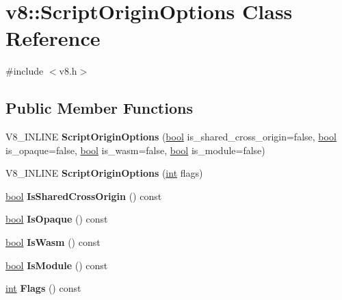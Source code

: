 \hypertarget{classv8_1_1ScriptOriginOptions}{}\section{v8\+:\+:Script\+Origin\+Options Class Reference}
\label{classv8_1_1ScriptOriginOptions}


{\ttfamily \#include $<$v8.\+h$>$}

\subsection*{Public Member Functions}
\begin{DoxyCompactItemize}
\item 
\mbox{\label{classv8_1_1ScriptOriginOptions_ae041fe05628cdd2d434c8780f45ac1e4}} 
V8\+\_\+\+I\+N\+L\+I\+NE {\bfseries Script\+Origin\+Options} (\mbox{\hyperlink{classbool}{bool}} is\+\_\+shared\+\_\+cross\+\_\+origin=false, \mbox{\hyperlink{classbool}{bool}} is\+\_\+opaque=false, \mbox{\hyperlink{classbool}{bool}} is\+\_\+wasm=false, \mbox{\hyperlink{classbool}{bool}} is\+\_\+module=false)
\item 
\mbox{\label{classv8_1_1ScriptOriginOptions_a5c814c5602db2c9ed5c6bc7f05b1d430}} 
V8\+\_\+\+I\+N\+L\+I\+NE {\bfseries Script\+Origin\+Options} (\mbox{\hyperlink{classint}{int}} flags)
\item 
\mbox{\label{classv8_1_1ScriptOriginOptions_af899dc2dfbcfdbe84eb57ca5f6e92c86}} 
\mbox{\hyperlink{classbool}{bool}} {\bfseries Is\+Shared\+Cross\+Origin} () const
\item 
\mbox{\label{classv8_1_1ScriptOriginOptions_ab6fb2e1fee9bf7cd5a4b141c3abc5df3}} 
\mbox{\hyperlink{classbool}{bool}} {\bfseries Is\+Opaque} () const
\item 
\mbox{\label{classv8_1_1ScriptOriginOptions_a31e78eb1c657b0cf029116b6147f03a5}} 
\mbox{\hyperlink{classbool}{bool}} {\bfseries Is\+Wasm} () const
\item 
\mbox{\label{classv8_1_1ScriptOriginOptions_a30b72cba616f576272a29b6e199c9c35}} 
\mbox{\hyperlink{classbool}{bool}} {\bfseries Is\+Module} () const
\item 
\mbox{\label{classv8_1_1ScriptOriginOptions_ad66acb13746ba12f6b5177c215e4d10d}} 
\mbox{\hyperlink{classint}{int}} {\bfseries Flags} () const
\end{DoxyCompactItemize}


